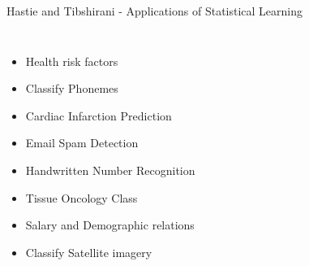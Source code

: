 \documentclass{beamer}
\begin{document}
\begin{frame}[t]{Hastie and Tibshirani - Applications of Statistical Learning}
	\begin{columns}
		\begin{itemize}[<+>]
			\item Health risk factors
			\item Classify Phonemes
			\item Cardiac Infarction Prediction
			\item Email Spam Detection
			\item Handwritten Number Recognition
			\item Tissue Oncology Class
			\item Salary and Demographic relations
			\item Classify Satellite imagery
		\end{itemize}
	\end{columns}
\end{frame}
\end{document}
